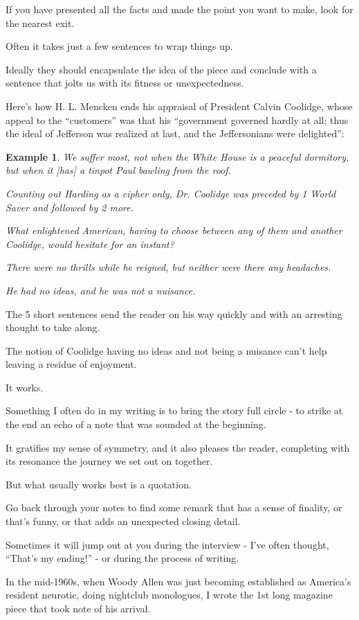 \documentclass{book}
\numberwithin{equation}{section}
\newtheorem{example}{Example}[chapter]
\begin{document}
If you have presented all the facts and made the point you want to make, look for the nearest exit.

%
Often it takes just a few sentences to wrap things up.

Ideally they should encapsulate the idea of the piece and conclude with a sentence that jolts us with its fitness or unexpectedness.

Here's how H. L. Mencken ends his appraisal of President Calvin Coolidge, whose appeal to the ``customers'' was that his ``government governed hardly at all; thus the ideal of Jefferson was realized at last, and the Jeffersonians were delighted'':
\begin{example}
    We suffer most, not when the White House is a peaceful dormitory, but when it [has] a tinpot Paul bawling from the roof.

    Counting out Harding as a cipher only, Dr. Coolidge was preceded by 1 World Saver and followed by 2 more.
    
    What enlightened American, having to choose between any of them and another Coolidge, would hesitate for an instant?
    
    There were no thrills while he reigned, but neither were there any headaches.
    
    He had no ideas, and he was not a nuisance.
\end{example}
The 5 short sentences send the reader on his way quickly and with an arresting thought to take along.

The notion of Coolidge having no ideas and not being a nuisance can't help leaving a residue of enjoyment.

It works.

%
Something I often do in my writing is to bring the story full circle - to strike at the end an echo of a note that was sounded at the beginning.

It gratifies my sense of symmetry, and it also pleases the reader, completing with its resonance the journey we set out on together.

%
But what usually works best is a quotation.

Go back through your notes to find some remark that has a sense of finality, or that's funny, or that adds an unexpected closing detail.

Sometimes it will jump out at you during the interview - I've often thought, ``That's my ending!'' - or during the process of writing.

In the mid-1960s, when Woody Allen was just becoming established as America's resident neurotic, doing nightclub monologues, I wrote the 1st long magazine piece that took note of his arrival.
\end{document}
